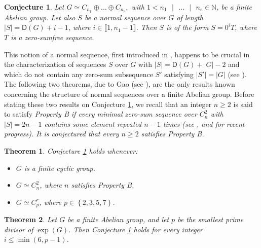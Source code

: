 \documentclass[english,12pt,a4paper,twoside]{smfart}
\theoremstyle{plain}
\newtheorem{theorem}{Theorem}[section]
\newtheorem{conjecture}{Conjecture}
\theoremstyle{definition}
\theoremstyle{remark}
\begin{document}
\begin{conjecture}\label{conjecture Gao} Let $G \simeq C_{n_1} \oplus \dots \oplus C_{n_r},$ with $1 < n_1 \text{ } |\text{ } \dots \text{ }|\text{ } n_r \in \mathbb{N}$, be a finite Abelian group. Let also $S$ be a normal sequence over $G$ of length $\left|S\right|=\mathsf{D}(G)+i-1$, where $i \in \llbracket 1,n_1-1 \rrbracket$. Then $S$ is of the form $S=0^iT$, where $T$ is a zero-sumfree sequence.
\end{conjecture}

This notion of a normal sequence, first introduced in \cite{Gao06}, happens to be crucial in the characterization of sequences $S$ over $G$ with $\left|S\right|=\mathsf{D}(G)+\left|G\right|-2$ and which do not contain any zero-sum subsequence $S'$ satisfying $\left|S'\right|=\left|G\right|$ (see \cite[Theorem $1.7$]{Gao06}). The following two theorems, due to Gao (see \cite[Theorems $1.5$ and $1.6$]{Gao06}), are the only results known concerning the structure of normal sequences over a finite Abelian group. Before stating these two results on Conjecture \ref{conjecture Gao}, we recall that an integer $n \geq 2$ is said to satisfy \em Property B \em if every minimal zero-sum sequence over $C^2_n$ with $|S|=2n-1$ contains some element repeated $n-1$ times (see \cite[Section $5.8$]{GeroKoch05}, and \cite{GaoGeroGrynkie08,GaoGeroSchmid07,Wolfgang} for recent progress). It is conjectured that every $n \geq 2$ satisfies Property B.

\begin{theorem}\label{Theoreme Gao 1} 
Conjecture \ref{conjecture Gao} holds whenever:
\begin{itemize}
\item[$(i)$] $G$ is a finite cyclic group.

\item[$(ii)$] $G \simeq C^2_n$, where $n$ satisfies Property B.

\item[$(iii)$] $G \simeq C^r_p$, where $p \in \left\{2,3,5,7\right\}$.
\end{itemize}
\end{theorem}

\begin{theorem}\label{Theoreme Gao 2}
Let $G$ be a finite Abelian group, and let $p$ be the smallest prime divisor of $\exp(G)$. Then Conjecture \ref{conjecture Gao} holds for every integer $i \leq \min\left(6,p-1\right)$. 
\end{theorem}
\end{document}
